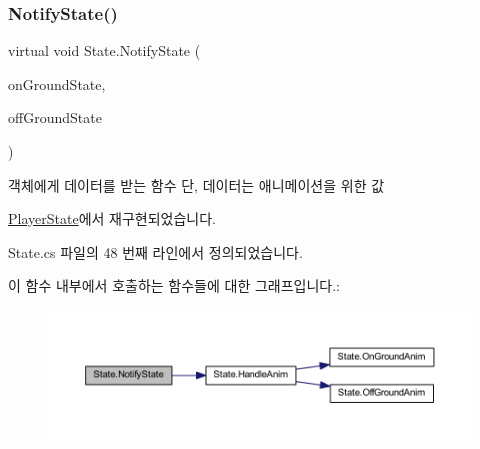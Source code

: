 \subsubsection{\texorpdfstring{NotifyState()}{NotifyState()}}
{\footnotesize\ttfamily virtual void State.\+Notify\+State (\begin{DoxyParamCaption}\item[{\mbox{\hyperlink{class_state_ab9eb1c1d81f1903b8486d1275e78b68e}{On\+Ground}}}]{on\+Ground\+State,  }\item[{\mbox{\hyperlink{class_state_a7d945e793324c017a973205564cf1a56}{Off\+Ground}}}]{off\+Ground\+State }\end{DoxyParamCaption})\hspace{0.3cm}{\ttfamily [virtual]}}



객체에게 데이터를 받는 함수 단, 데이터는 애니메이션을 위한 값 



\mbox{\hyperlink{class_player_state_a59f3f64c24ba1b6e34e34cb23746ecb0}{Player\+State}}에서 재구현되었습니다.



State.\+cs 파일의 48 번째 라인에서 정의되었습니다.


\begin{DoxyCode}{0}

\end{DoxyCode}
이 함수 내부에서 호출하는 함수들에 대한 그래프입니다.\+:
\nopagebreak
\begin{figure}[H]
\begin{center}
\leavevmode
\includegraphics[width=350pt]{d0/d8b/class_state_a989a27f9b711812d983344ee381da419_cgraph}
\end{center}
\end{figure}
\mbox{\label{class_state_a2909a234430fa7752fadf2bb993ab5e2}} 
